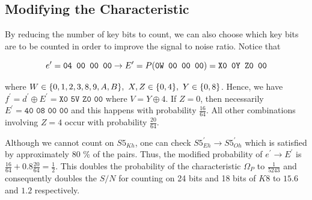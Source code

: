\documentclass[twoside]{article}
\begin{document}
\subsection{Modifying the Characteristic}
By reducing the number of key bits to count, we can also choose which key bits
are to be counted in order to improve the signal to noise ratio. Notice that

\begin{equation}
    e^\prime = \texttt{04 00 00 00} \rightarrow E^\prime = P(\texttt{0W 00 00 00}) = \texttt{X0 0Y Z0 00}
    \label{eq:des-8-r5-rel}
\end{equation}

where \(W \in \{0,1,2,3,8,9,A,B\},\ X,Z \in \{0,4\},\ Y \in
\{0,8\}\). Hence, we have \(f^\prime = d^\prime \oplus E^\prime = \texttt{X0
5V Z0 00}\) where \(V = Y \oplus 4\). If \(Z = 0\), then necessarily \(E^\prime
= \texttt{40 08 00 00}\) and this happens with probability \(\frac{16}{64}\).
All other combinations involving \(Z = 4\) occur with probability
\(\frac{20}{64}\).

Although we cannot count on \(S5_{Kh}\), one can check \(S5^\prime_{Eh}
\rightarrow S5^\prime_{Oh}\) which is satisfied by approximately 80 \% of the
pairs. Thus, the modified probability of \(e^\prime \rightarrow E^\prime\) is
\(\frac{16}{64} + 0.8\frac{20}{64} = \frac{1}{2}\). This doubles the probability
of the characteristic \(\Omega_P\) to \(\frac{1}{5243}\) and consequently
doubles the \(S/N\) for counting on 24 bits and 18 bits of \(K8\) to \(15.6\)
and \(1.2\) respectively.
\end{document}
